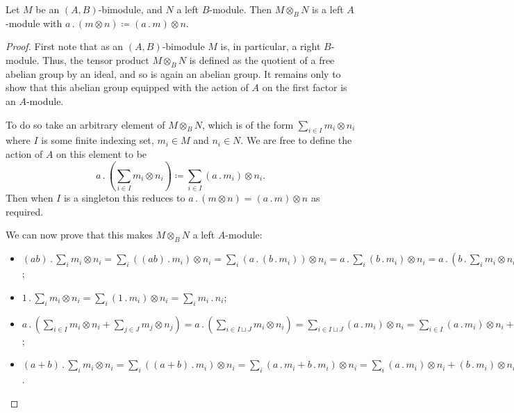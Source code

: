 \documentclass[fleqn]{NotesClass}
\newcommand{\action}{\mathbin{.}}
\begin{document}
    \begin{lma}{}{}
        Let \(M\) be an \((A, B)\)-bimodule, and \(N\) a left \(B\)-module.
        Then \(M \otimes_B N\) is a left \(A\)-module with \(a \action (m \otimes n) \coloneqq (a \action m) \otimes n\).
        \begin{proof}
            First note that as an \((A, B)\)-bimodule \(M\) is, in particular, a right \(B\)-module.
            Thus, the tensor product \(M \otimes_B N\) is defined as the quotient of a free abelian group by an ideal, and so is again an abelian group.
            It remains only to show that this abelian group equipped with the action of \(A\) on the first factor is an \(A\)-module.
            
            To do so take an arbitrary element of \(M \otimes_B N\), which is of the form \(\sum_{i \in I} m_i \otimes n_i\) where \(I\) is some finite indexing set, \(m_i \in M\) and \(n_i \in N\).
            We are free to define the action of \(A\) on this element to be
            \begin{equation}
                a \action \left( {\textstyle \sum_{i \in I}} m_i \otimes n_i \right) \coloneqq {\textstyle \sum_{i \in I}} (a \action m_i) \otimes n_i.
            \end{equation}
            Then when \(I\) is a singleton this reduces to \(a \action (m \otimes n) = (a \action m) \otimes n\) as required.
            
            We can now prove that this makes \(M \otimes_B N\) a left \(A\)-module:
            \begin{itemize}
                \item[M1] \((ab) \action \sum_{i} m_i \otimes n_i = \sum_{i} ((ab) \action m_i) \otimes n_i = \sum_{i} (a \action (b \action m_i)) \otimes n_i = a \action \sum_i (b \action m_i) \otimes n_i = a \action \left( b \action \sum_i m_i \otimes n_i \right)\);
                \item[M2] \(1 \action \sum_i m_i \otimes n_i = \sum_i (1 \action m_i) \otimes n_i = \sum_i m_i \action n_i\);
                \item[M3] \(a \action \left( \sum_{i \in I} m_i \otimes n_i + \sum_{j \in J} m_j \otimes n_j \right) = a \action \left( \sum_{i \in I \sqcup J} m_i \otimes n_i \right) = \sum_{i \in I \sqcup J} (a \action m_i) \otimes n_i = \sum_{i \in I} (a \action m_i) \otimes n_i + \sum_{j \in J} (a \action m_j) \otimes n_j\);
                \item[M4] \((a + b) \action \sum_i m_i \otimes n_i = \sum_i ((a + b) \action m_i) \otimes n_i = \sum_i (a \action m_i + b \action m_i) \otimes n_i = \sum_i (a \action m_i) \otimes n_i + (b \action m_i) \otimes n_i = a \action \sum_i m_i \otimes n_i + b \action \sum_i m_i \otimes n_i\). 
            \end{itemize}
        \end{proof}
    \end{lma}
    
\end{document}
